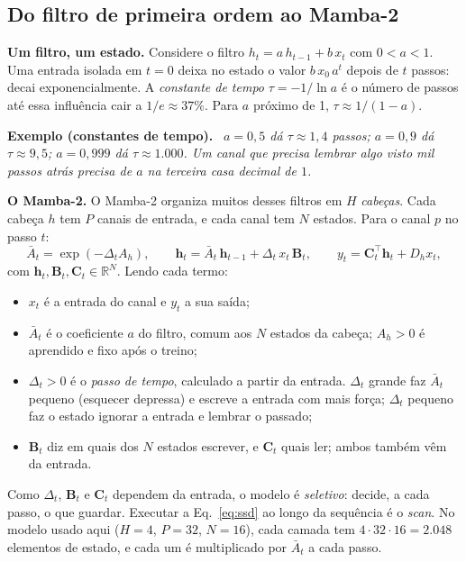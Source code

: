 \documentclass[12pt]{article}
\newenvironment{exemplo}[1]{\par\smallskip\noindent\textbf{Exemplo (#1).}\ \itshape}{\par\smallskip}
\begin{document}
\subsection{Do filtro de primeira ordem ao Mamba-2}
\textbf{Um filtro, um estado.} Considere o filtro $h_t = a\,h_{t-1} + b\,x_t$ com $0 < a < 1$. Uma entrada isolada em $t=0$ deixa no estado o valor $b\,x_0\,a^t$ depois de $t$ passos: decai exponencialmente. A \emph{constante de tempo} $\tau = -1/\ln a$ é o número de passos até essa influência cair a $1/e \approx 37\%$. Para $a$ próximo de 1, $\tau \approx 1/(1-a)$.

\begin{exemplo}{constantes de tempo}
$a = 0{,}5$ dá $\tau \approx 1{,}4$ passos; $a = 0{,}9$ dá $\tau \approx 9{,}5$; $a = 0{,}999$ dá $\tau \approx 1.000$. Um canal que precisa lembrar algo visto mil passos atrás precisa de $a$ na terceira casa decimal de $1$.
\end{exemplo}

\textbf{O Mamba-2.} O Mamba-2 \cite{dao2024transformers} organiza muitos desses filtros em $H$ \emph{cabeças}. Cada cabeça $h$ tem $P$ canais de entrada, e cada canal tem $N$ estados. Para o canal $p$ no passo $t$:
\begin{equation}
  \bar{A}_t = \exp(-\Delta_t A_h), \qquad
  \mathbf{h}_t = \bar{A}_t\, \mathbf{h}_{t-1} + \Delta_t\, x_t\, \mathbf{B}_t, \qquad
  y_t = \mathbf{C}_t^{\top} \mathbf{h}_t + D_h x_t ,
  \label{eq:ssd}
\end{equation}
com $\mathbf{h}_t, \mathbf{B}_t, \mathbf{C}_t \in \mathbb{R}^N$. Lendo cada termo:
\begin{itemize}
  \item $x_t$ é a entrada do canal e $y_t$ a sua saída;
  \item $\bar{A}_t$ é o coeficiente $a$ do filtro, comum aos $N$ estados da cabeça; $A_h > 0$ é aprendido e fixo após o treino;
  \item $\Delta_t > 0$ é o \emph{passo de tempo}, calculado a partir da entrada. $\Delta_t$ grande faz $\bar{A}_t$ pequeno (esquecer depressa) e escreve a entrada com mais força; $\Delta_t$ pequeno faz o estado ignorar a entrada e lembrar o passado;
  \item $\mathbf{B}_t$ diz em quais dos $N$ estados escrever, e $\mathbf{C}_t$ quais ler; ambos também vêm da entrada.
\end{itemize}
Como $\Delta_t$, $\mathbf{B}_t$ e $\mathbf{C}_t$ dependem da entrada, o modelo é \emph{seletivo}: decide, a cada passo, o que guardar. Executar a Eq.~\ref{eq:ssd} ao longo da sequência é o \emph{scan}. No modelo usado aqui ($H=4$, $P=32$, $N=16$), cada camada tem $4 \cdot 32 \cdot 16 = 2.048$ elementos de estado, e cada um é multiplicado por $\bar{A}_t$ a cada passo.
\end{document}
